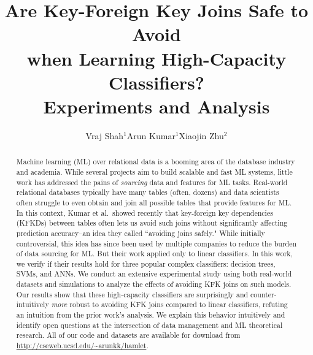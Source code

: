 \documentclass{vldb}
\title{Are Key-Foreign Key Joins Safe to Avoid \\when Learning High-Capacity Classifiers?\\ \lbrack Experiments and Analysis\rbrack }
\author{
\alignauthor Vraj Shah$^1$\hspace{20mm}Arun Kumar$^1$\hspace{20mm}Xiaojin Zhu$^2$\\
\affaddr{\vspace{2mm}$^1$University of California, San Diego\hspace{20mm}$^2$University of Wisconsin-Madison}
\email{\{vps002, arunkk\}@eng.ucsd.edu, jerryzhu@cs.wisc.edu}
}
\begin{document}
\maketitle

\begin{abstract}
Machine learning (ML) over relational data is a booming area of the database industry and 
academia. While several projects aim to build scalable and fast ML systems, little work has 
addressed the pains of \textit{sourcing} data and features for ML tasks. 
Real-world relational databases typically have many tables (often, dozens) and data scientists 
often struggle to even obtain and join all possible tables that provide features for ML. 
In this context, Kumar et al.~showed recently that key-foreign key dependencies (KFKDs) 
between tables often lets us avoid such joins without significantly affecting prediction 
accuracy--an idea they called ``avoiding joins safely." While initially controversial, this idea 
has since been used by multiple companies to reduce the burden of data sourcing for ML.
But their work applied only to linear classifiers. In this work, we verify if their results hold 
for three popular complex classifiers: decision trees, SVMs, and ANNs. We conduct an 
extensive experimental study using both real-world datasets and simulations to analyze the 
effects of avoiding KFK joins on such models. Our results show that these high-capacity classifiers 
are surprisingly and counter-intuitively \textit{more} robust to avoiding KFK joins compared to 
linear classifiers, refuting an intuition from the prior work's analysis. We explain this behavior 
intuitively and identify open questions at the intersection of data management and ML 
theoretical research. All of our code and datasets are available for download from 
\url{http://cseweb.ucsd.edu/~arunkk/hamlet}.
\end{abstract}
\end{document}
